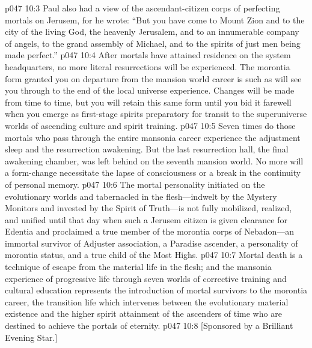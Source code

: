 \vs p047 10:3 Paul also had a view of the ascendant\hyp{}citizen corps of perfecting mortals on Jerusem, for he wrote: “But you have come to Mount Zion and to the city of the living God, the heavenly Jerusalem, and to an innumerable company of angels, to the grand assembly of Michael, and to the spirits of just men being made perfect.”
\pc \vs p047 10:4 After mortals have attained residence on the system headquarters, no more literal resurrections will be experienced. The morontia form granted you on departure from the mansion world career is such as will see you through to the end of the local universe experience. Changes will be made from time to time, but you will retain this same form until you bid it farewell when you emerge as first\hyp{}stage spirits preparatory for transit to the superuniverse worlds of ascending culture and spirit training.
\vs p047 10:5 Seven times do those mortals who pass through the entire mansonia career experience the adjustment sleep and the resurrection awakening. But the last resurrection hall, the final awakening chamber, was left behind on the seventh mansion world. No more will a form\hyp{}change necessitate the lapse of consciousness or a break in the continuity of personal memory.
\pc \vs p047 10:6 The mortal personality initiated on the evolutionary worlds and tabernacled in the flesh---indwelt by the Mystery Monitors and invested by the Spirit of Truth---is not fully mobilized, realized, and unified until that day when such a Jerusem citizen is given clearance for Edentia and proclaimed a true member of the morontia corps of Nebadon---an immortal survivor of Adjuster association, a Paradise ascender, a personality of morontia status, and a true child of the Most Highs.\plusone
\pc \vs p047 10:7 Mortal death is a technique of escape from the material life in the flesh; and the mansonia experience of progressive life through seven worlds of corrective training and cultural education represents the introduction of mortal survivors to the morontia career, the transition life which intervenes between the evolutionary material existence and the higher spirit attainment of the ascenders of time who are destined to achieve the portals of eternity.
\vsetoff
\vs p047 10:8 [Sponsored by a Brilliant Evening Star.]\plusone
